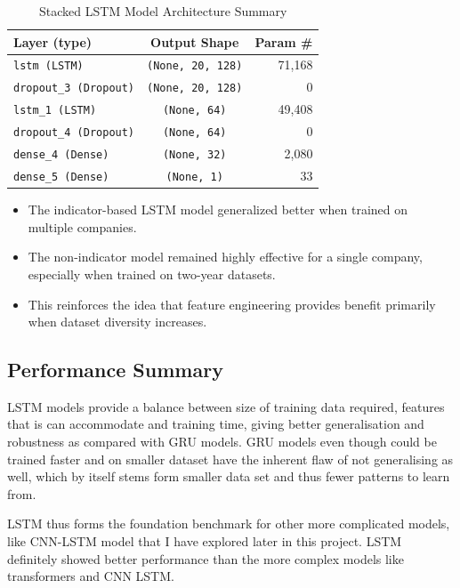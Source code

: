 \begin{table}[h]
    \centering
    \begin{tabular}{|l|c|r|}
        \hline
        \textbf{Layer (type)} & \textbf{Output Shape} & \textbf{Param \#} \\
        \hline
        \hline
        \texttt{lstm (LSTM)} & \texttt{(None, 20, 128)} & 71,168 \\
        \hline
        \texttt{dropout\_3 (Dropout)} & \texttt{(None, 20, 128)} & 0 \\
        \hline
        \texttt{lstm\_1 (LSTM)} & \texttt{(None, 64)} & 49,408 \\
        \hline
        \texttt{dropout\_4 (Dropout)} & \texttt{(None, 64)} & 0 \\
        \hline
        \texttt{dense\_4 (Dense)} & \texttt{(None, 32)} & 2,080 \\
        \hline
        \texttt{dense\_5 (Dense)} & \texttt{(None, 1)} & 33 \\
        \hline
    \end{tabular}
    \caption{Stacked LSTM Model Architecture Summary}
    \label{tab:lstm_architecture_3}
\end{table}

\begin{itemize}
  \item The indicator-based LSTM model generalized better when trained on multiple companies.
  \item The non-indicator model remained highly effective for a single company, especially when trained on two-year datasets.
  \item This reinforces the idea that feature engineering provides benefit primarily when dataset diversity increases.
\end{itemize}

\subsection{Performance Summary}

LSTM models provide a balance between size of training data required, features that is can accommodate and training time, giving better generalisation and robustness as compared with GRU models. GRU models even though could be trained faster and on smaller dataset have the inherent flaw of not generalising as well, which by itself stems form smaller data set and thus fewer patterns to learn from.

LSTM thus forms the foundation benchmark for other more complicated models, like CNN-LSTM model that I have explored later in this project. LSTM definitely showed better performance than the more complex models like transformers and CNN LSTM.

